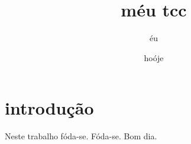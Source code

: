 \documentclass{article}
\author{éu}
\date{hoóje}
\title{méu tcc}
\begin{document}
\maketitle

\newpage

\section{introdução}
\Huge
Neste trabalho fóda-se.
Fóda-se.
Bom dia.
\end{document}
